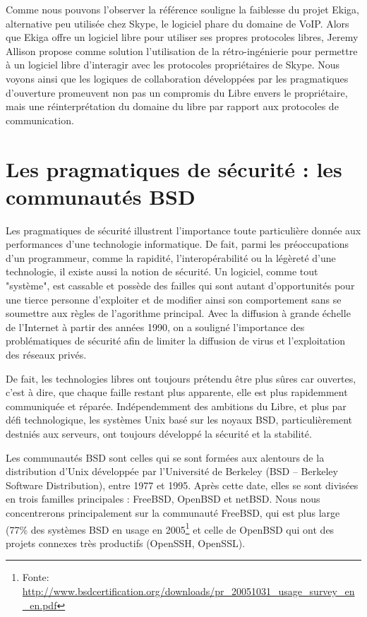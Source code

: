 Comme nous pouvons l'observer la référence souligne la faiblesse du projet Ekiga, alternative peu utilisée chez Skype, le logiciel phare du domaine de VoIP. Alors que Ekiga offre un logiciel libre pour utiliser ses propres protocoles libres, Jeremy Allison propose comme solution l'utilisation de la rétro-ingénierie pour permettre à un logiciel libre d'interagir avec les protocoles propriétaires de Skype. Nous voyons ainsi que les logiques de collaboration développées par les pragmatiques d'ouverture promeuvent non pas un compromis du Libre envers le propriétaire, mais une réinterprétation du domaine du libre par rapport aux protocoles de communication.

\section{Les pragmatiques de sécurité : les communautés BSD}\label{3.3}

Les pragmatiques de sécurité illustrent l'importance toute particulière donnée aux performances d'une technologie informatique. De fait, parmi les préoccupations d'un programmeur, comme la rapidité, l'interopérabilité ou la légèreté d'une technologie, il existe aussi la notion de sécurité. Un logiciel, comme tout "système", est cassable et possède des failles qui sont autant d'opportunités pour une tierce personne d'exploiter et de modifier ainsi son comportement sans se soumettre aux règles de l'agorithme principal. Avec la diffusion à grande échelle de l'Internet à partir des années 1990, on a souligné l'importance des problématiques de sécurité afin de limiter la diffusion de virus et l'exploitation des réseaux privés.

De fait, les technologies libres ont toujours prétendu être plus sûres car ouvertes, c'est à dire, que chaque faille restant plus apparente, elle est plus rapidemment communiquée et réparée. Indépendemment des ambitions du Libre, et plus par défi technologique, les systèmes Unix basé sur les noyaux BSD, particulièrement destniés aux serveurs, ont toujours développé la sécurité et la stabilité.

Les communautés BSD sont celles qui se sont formées aux alentours de la distribution d'Unix développée par l'Université de Berkeley (BSD -- Berkeley Software Distribution), entre 1977 et 1995. Après cette date, elles se sont divisées en trois familles principales : FreeBSD, OpenBSD et netBSD. Nous nous concentrerons principalement sur la communauté FreeBSD, qui est plus large (77\% des systèmes BSD en usage en 2005\footnote{Fonte: \url{http://www.bsdcertification.org/downloads/pr_20051031_usage_survey_en_en.pdf}} et celle de OpenBSD qui ont des projets connexes très productifs (OpenSSH, OpenSSL).

